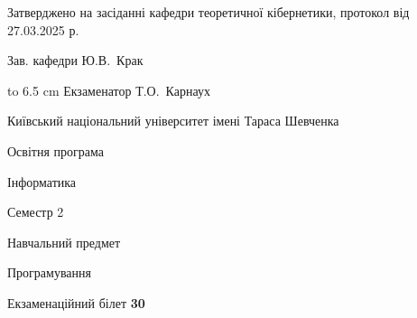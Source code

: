 \documentclass[12pt, ukrainian]{article}
\begin{document}
{\smallskip\smallskip \begin {scriptsize} Затверджено на засіданні кафедри теоретичної кібернетики, протокол   від   27.03.2025 р.\par\smallskip\smallskip\smallskip\smallskip
{\parbox {6.5 cm} {Зав. кафедри \dotfill Ю.В.~Крак}}\hspace {0.7cm} {\hbox to 6.5 cm { Екзаменатор \dotfill Т.О.~Карнаух}} \end{scriptsize}}
\newpage
{{\begin {scriptsize}\par
{ \center  Київський національний університет імені Тараса Шевченка \par}
{\parbox {5 cm}{Освітня програма \hfill}{\parbox {7 cm}{Інформатика\hfill}}\parbox {6 cm}{\hfill Семестр 2}}\par
{\parbox {5 cm} {Навчальний предмет \hfill}\parbox {7 cm}{Програмування \hfill}\parbox {6cm}{\hfill}\par}\vspace{-15pt} \end{scriptsize}}{\center Екзаменаційний білет \No \textbf { 30 }\par}}
\end{document}
